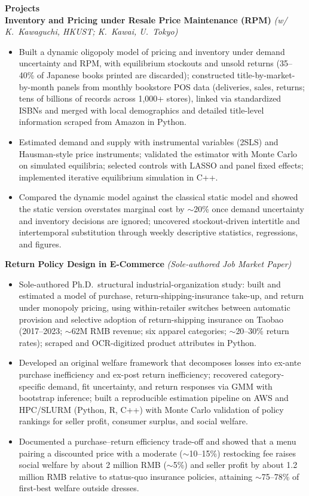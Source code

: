 \documentclass[11pt,letterpaper]{article}
\begin{document}
{\large \textbf{Projects}}\\[-0.5pt]
\textbf{Inventory and Pricing under Resale Price Maintenance (RPM)} \textit{(w/ K.\ Kawaguchi, HKUST; K.\ Kawai, U.\ Tokyo)}\\
\vspace{-6pt}
\begin{itemize}
  \item Built a dynamic oligopoly model of pricing and inventory under demand uncertainty and RPM, with equilibrium stockouts and unsold returns (35--40\% of Japanese books printed are discarded); constructed title-by-market-by-month panels from monthly bookstore POS data (deliveries, sales, returns; tens of billions of records across 1{,}000+ stores), linked via standardized ISBNs and merged with local demographics and detailed title-level information scraped from Amazon in Python.
  \item Estimated demand and supply with instrumental variables (2SLS) and Hausman-style price instruments; validated the estimator with Monte Carlo on simulated equilibria; selected controls with LASSO and panel fixed effects; implemented iterative equilibrium simulation in C++.
  \item Compared the dynamic model against the classical static model and showed the static version overstates marginal cost by \(\sim\)20\% once demand uncertainty and inventory decisions are ignored; uncovered stockout-driven intertitle and intertemporal substitution through weekly descriptive statistics, regressions, and figures.
\end{itemize}
\vspace{-3pt}
\textbf{Return Policy Design in E-Commerce} \textit{(Sole-authored Job Market Paper)}\\
\vspace{-6pt}
\begin{itemize}
  \item Sole-authored Ph.D.\ structural industrial-organization study: built and estimated a model of purchase, return-shipping-insurance take-up, and return under monopoly pricing, using within-retailer switches between automatic provision and selective adoption of return-shipping insurance on Taobao (2017--2023; \(\sim\)62M RMB revenue; six apparel categories; \(\sim\)20--30\% return rates); scraped and OCR-digitized product attributes in Python.
  \item Developed an original welfare framework that decomposes losses into ex-ante purchase inefficiency and ex-post return inefficiency; recovered category-specific demand, fit uncertainty, and return responses via GMM with bootstrap inference; built a reproducible estimation pipeline on AWS and HPC/SLURM (Python, R, C++) with Monte Carlo validation of policy rankings for seller profit, consumer surplus, and social welfare.
  \item Documented a purchase--return efficiency trade-off and showed that a menu pairing a discounted price with a moderate (\(\sim\)10--15\%) restocking fee raises social welfare by about 2 million RMB (\(\sim\)5\%) and seller profit by about 1.2 million RMB relative to status-quo insurance policies, attaining \(\sim\)75--78\% of first-best welfare outside dresses.
\end{itemize}
\end{document}
